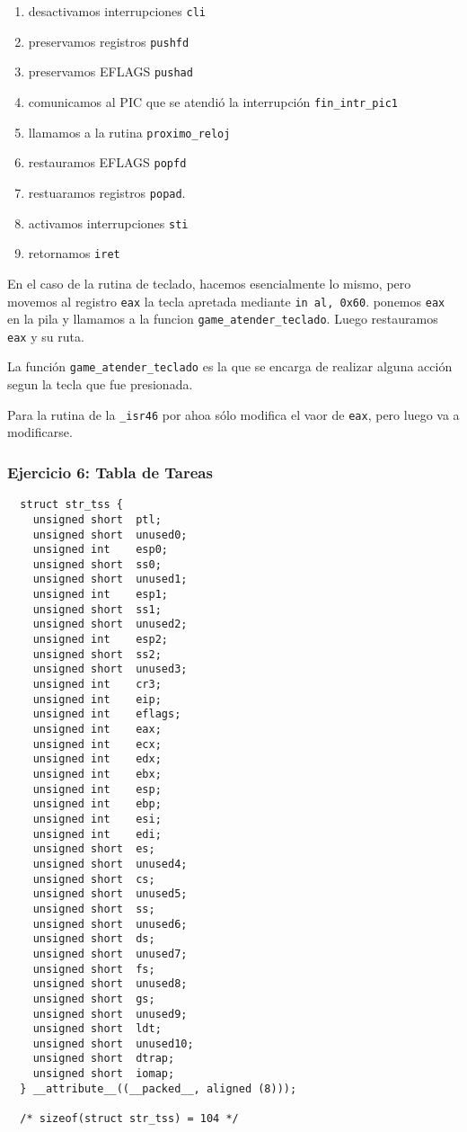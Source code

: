 \documentclass[twocolumn,10pt]{article}
\begin{document}
\begin{enumerate}
\item desactivamos interrupciones \texttt{cli}
\item preservamos registros \texttt{pushfd}
\item preservamos EFLAGS \texttt{pushad}
\item comunicamos al PIC que se atendió la interrupción
  \texttt{fin\_intr\_pic1}
\item llamamos a la rutina \texttt{proximo\_reloj}
\item restauramos EFLAGS \texttt{popfd}
\item restuaramos registros \texttt{popad}. 
\item activamos interrupciones \texttt{sti}
\item retornamos \texttt{iret}
\end{enumerate}

En el caso de la rutina de teclado, hacemos esencialmente lo mismo,
pero movemos al registro \texttt{eax} la tecla apretada mediante
\texttt{in al, 0x60}. ponemos \texttt{eax} en la pila y llamamos a la
funcion \texttt{game\_atender\_teclado}. Luego restauramos \texttt{eax}
y su ruta.

La función \texttt{game\_atender\_teclado} es la que se encarga de realizar
alguna acción segun la tecla que fue presionada.

Para la rutina de la \texttt{\_isr46} por ahoa sólo modifica el vaor
de \texttt{eax}, pero luego va a modificarse.

\subsubsection{Ejercicio 6: Tabla de Tareas}

\begin{lstlisting}
  struct str_tss {
    unsigned short  ptl;
    unsigned short  unused0;
    unsigned int    esp0;
    unsigned short  ss0;
    unsigned short  unused1;
    unsigned int    esp1;
    unsigned short  ss1;
    unsigned short  unused2;
    unsigned int    esp2;
    unsigned short  ss2;
    unsigned short  unused3;
    unsigned int    cr3;
    unsigned int    eip;
    unsigned int    eflags;
    unsigned int    eax;
    unsigned int    ecx;
    unsigned int    edx;
    unsigned int    ebx;
    unsigned int    esp;
    unsigned int    ebp;
    unsigned int    esi;
    unsigned int    edi;
    unsigned short  es;
    unsigned short  unused4;
    unsigned short  cs;
    unsigned short  unused5;
    unsigned short  ss;
    unsigned short  unused6;
    unsigned short  ds;
    unsigned short  unused7;
    unsigned short  fs;
    unsigned short  unused8;
    unsigned short  gs;
    unsigned short  unused9;
    unsigned short  ldt;
    unsigned short  unused10;
    unsigned short  dtrap;
    unsigned short  iomap;
  } __attribute__((__packed__, aligned (8)));

  /* sizeof(struct str_tss) = 104 */
\end{lstlisting}
\end{document}
